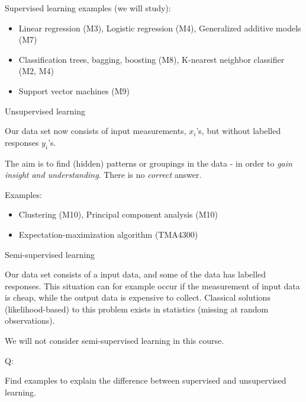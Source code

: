 \documentclass[ignorenonframetext,]{beamer}
\providecommand{\tightlist}{%
  \setlength{\itemsep}{0pt}\setlength{\parskip}{0pt}}
\begin{document}
\begin{frame}

Supervised learning examples (we will study):

\begin{itemize}
\tightlist
\item
  Linear regression (M3), Logistic regression (M4), Generalized additive
  models (M7)
\item
  Classification trees, bagging, boosting (M8), K-nearest neighbor
  classifier (M2, M4)
\item
  Support vector machines (M9)
\end{itemize}

\end{frame}

\begin{frame}

\begin{block}{Unsupervised learning}

Our data set now consists of input measurements, \(x_i\)'s, but without
labelled responses \(y_i\)'s.

The aim is to find (hidden) patterns or groupings in the data - in order
to \emph{gain insight and understanding}. There is no \emph{correct}
answer.

Examples:

\begin{itemize}
\tightlist
\item
  Clustering (M10), Principal component analysis (M10)
\item
  Expectation-maximization algorithm (TMA4300)
\end{itemize}

\end{block}

\end{frame}

\begin{frame}

\begin{block}{Semi-supervised learning}

Our data set consists of a input data, and some of the data has labelled
responses. This situation can for example occur if the measurement of
input data is cheap, while the output data is expensive to collect.
Classical solutions (likelihood-based) to this problem exists in
statistics (missing at random observations).

We will not consider semi-supervised learning in this course.

\begin{block}{Q:}

Find examples to explain the difference between supervised and
unsupervised learning.

\end{block}

\end{block}

\end{frame}
\end{document}
